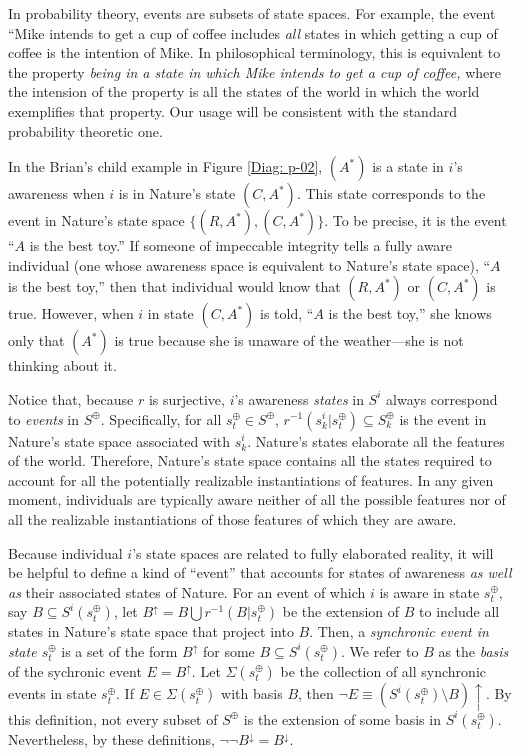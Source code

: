 \documentclass[
11pt,
titlepage,
reqno,
]{article}%
\theoremstyle{definition}
\begin{document}
	In probability theory, events are subsets of state spaces. 
	For example, the event ``Mike intends to get a cup of coffee includes \textit{all} states in which getting a cup of coffee is the intention of Mike. 
	In philosophical terminology, this is equivalent to the property \textit{being in a state in which Mike intends to get a cup of coffee,} where the intension of the property is all the states of the world in which the world exemplifies that property.
	Our usage will be consistent with the standard probability theoretic one.
	
	In the Brian's child example in Figure \ref{Diag: p-02}, $(A^\ast)$ is a state in $i$'s awareness when $i$ is in Nature's state $(C,A^\ast)$.
	This state corresponds to the event in Nature's state space $\{(R,A^\ast),(C,A^\ast)\}$. 
	To be precise, it is the event ``$A$ is the best toy.'' 
	If someone of impeccable integrity tells a fully aware individual (one whose awareness space is equivalent to Nature's state space), ``$A$ is the best toy,'' then that individual would know that   $(R,A^\ast)$ or $(C,A^\ast)$ is true.
	However, when $i$ in state $(C,A^\ast)$ is told, ``$A$ is the best toy,'' she  knows only that $(A^\ast)$ is true because she is unaware of the weather---she is not thinking about it.
	
	Notice that, because $r$ is surjective, $i$'s awareness \textit{states} in $S^i$ always correspond to \textit{events} in $S^\oplus$.
	Specifically, for all $s^\oplus_t\in S^\oplus$, $r^{-1}(s^i_k|s^\oplus_t)\subseteq S^\oplus_k$ is the event in Nature's state space associated with $s^i_k$.
	Nature's states elaborate all the features of the world.
	Therefore, Nature's state space contains all the states required to account for all the potentially realizable instantiations of features.
	In any given moment, individuals are typically aware neither of all the possible features nor of all the realizable instantiations of those features of which they are aware. 
	
	
	
	Because individual $i$'s state spaces are related to fully elaborated reality, it will be helpful to define a kind of ``event'' that  accounts for states of awareness \textit{as well as} their associated states of Nature.
	For an event of which $i$ is aware in state $s^\oplus_t$, say $B\subseteq S^i(s^\oplus_t)$, let $B^{\uparrow}=B\bigcup r^{-1}(B|s^\oplus_t)$ be the extension of $B$ to include all states in Nature's state space that project into $B$.
	Then, a \textit{synchronic event in state $s^\oplus_t$} is a set of the form $B^{\uparrow}$ for some $B\subseteq S^i(s^\oplus_t)$.
	We refer to  $B$ as the \textit{basis} of the sychronic event $E=B^{\uparrow}$.
	Let $\Sigma(s^\oplus_t)$ be the collection of all synchronic events in state $s^\oplus_t$.
	If $E\in \Sigma(s^\oplus_t)$ with basis $B$, then $\neg E\equiv(S^i(s^\oplus_t)\setminus B)\uparrow$. 
	By this definition, not every subset of $S^\oplus$ is the extension of some basis in $S^i(s^\oplus_t)$.
	Nevertheless, by these definitions,  $\lnot\lnot B^\downarrow = B^\downarrow$.
	
\end{document}
